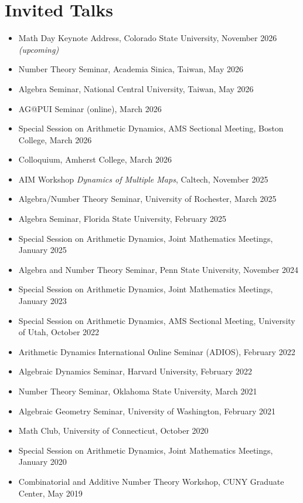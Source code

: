 \documentclass[11pt,letterpaper]{article}
\newcommand{\upcoming}{\textit{(upcoming)}}
\begin{document}
\section{Invited Talks}
\begin{itemize}
    \item Math Day Keynote Address, Colorado State University, November 2026 \upcoming
    \item Number Theory Seminar, Academia Sinica, Taiwan, May 2026
    \item Algebra Seminar, National Central University, Taiwan, May 2026
    \item AG@PUI Seminar (online), March 2026
    \item Special Session on Arithmetic Dynamics, AMS Sectional Meeting, Boston College, March 2026
    \item Colloquium, Amherst College, March 2026
    \item AIM Workshop \textit{Dynamics of Multiple Maps}, Caltech, November 2025
    \item Algebra/Number Theory Seminar, University of Rochester, March 2025
    \item Algebra Seminar, Florida State University, February 2025
    \item Special Session on Arithmetic Dynamics, Joint Mathematics Meetings, January 2025
    \item Algebra and Number Theory Seminar, Penn State University, November 2024
    \item Special Session on Arithmetic Dynamics, Joint Mathematics Meetings, January 2023
    \item Special Session on Arithmetic Dynamics, AMS Sectional Meeting, University of Utah, October 2022
    \item Arithmetic Dynamics International Online Seminar (ADIOS), February 2022
    \item Algebraic Dynamics Seminar, Harvard University, February 2022
    \item Number Theory Seminar, Oklahoma State University, March 2021
    \item Algebraic Geometry Seminar, University of Washington, February 2021
    \item Math Club, University of Connecticut, October 2020
    \item Special Session on Arithmetic Dynamics, Joint Mathematics Meetings, January 2020
    \item Combinatorial and Additive Number Theory Workshop, CUNY Graduate Center, May 2019

\end{itemize}
\end{document}

